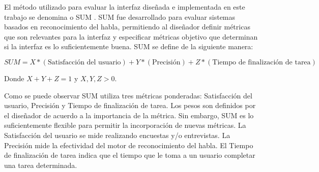 El m\'etodo utilizado para evaluar la interfaz dise\~nada e implementada en este trabajo se denomina 
o SUM \cite{GuptaUsability}. SUM fue desarrollado para evaluar sistemas basados en reconocimiento del habla,
permitiendo al dise\~nador definir m\'etricas que son relevantes para la interfaz y especificar m\'etricas 
objetivo que determinan si la interfaz es lo suficientemente buena. SUM se
define de la siguiente manera:

\begin{equation}
    SUM = X * (\text{Satisfacci\'on del usuario}) + Y * (\text{Precisi\'on}) + Z * (\text{Tiempo de finalizaci\'on de tarea})
\end{equation}

Donde $X + Y + Z = 1$ y $X, Y, Z > 0$.

Como se puede observar SUM utiliza tres m\'etricas ponderadas: Satisfacci\'on del usuario, Precisi\'on y Tiempo de finalizaci\'on de tarea. Los
pesos son definidos por el dise\~nador de acuerdo a la importancia de la m\'etrica. Sin embargo, SUM es lo suficientemente flexible para permitir
la incorporaci\'on de nuevas m\'etricas. La Satisfacci\'on del usuario se mide realizando encuestas y/o entrevistas. La Precisi\'on mide la
efectividad del motor de reconocimiento del habla. El Tiempo de finalizaci\'on de tarea indica que el tiempo que le toma a un usuario
completar una tarea determinada.
